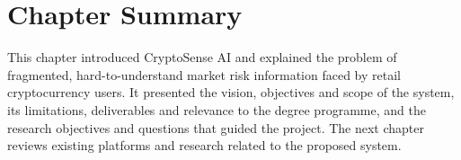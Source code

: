 \section{Chapter Summary}
This chapter introduced CryptoSense AI and explained the problem of fragmented, hard-to-understand market risk information faced by retail cryptocurrency users. It presented the vision, objectives and scope of the system, its limitations, deliverables and relevance to the degree programme, and the research objectives and questions that guided the project. The next chapter reviews existing platforms and research related to the proposed system.
